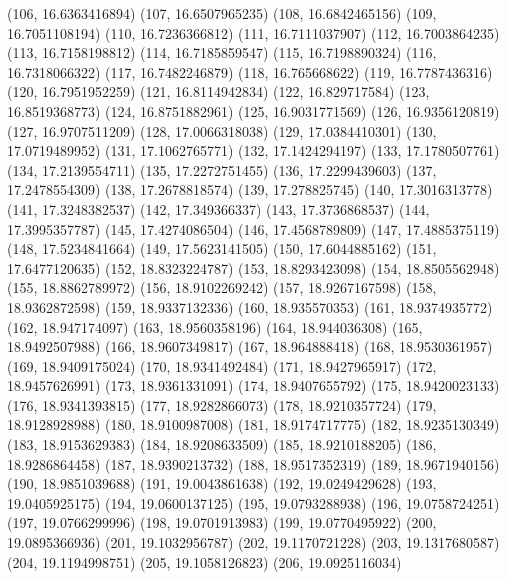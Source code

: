 {					(106, 16.6363416894)
					(107, 16.6507965235)
					(108, 16.6842465156)
					(109, 16.7051108194)
					(110, 16.7236366812)
					(111, 16.7111037907)
					(112, 16.7003864235)
					(113, 16.7158198812)
					(114, 16.7185859547)
					(115, 16.7198890324)
					(116, 16.7318066322)
					(117, 16.7482246879)
					(118, 16.765668622)
					(119, 16.7787436316)
					(120, 16.7951952259)
					(121, 16.8114942834)
					(122, 16.829717584)
					(123, 16.8519368773)
					(124, 16.8751882961)
					(125, 16.9031771569)
					(126, 16.9356120819)
					(127, 16.9707511209)
					(128, 17.0066318038)
					(129, 17.0384410301)
					(130, 17.0719489952)
					(131, 17.1062765771)
					(132, 17.1424294197)
					(133, 17.1780507761)
					(134, 17.2139554711)
					(135, 17.2272751455)
					(136, 17.2299439603)
					(137, 17.2478554309)
					(138, 17.2678818574)
					(139, 17.278825745)
					(140, 17.3016313778)
					(141, 17.3248382537)
					(142, 17.349366337)
					(143, 17.3736868537)
					(144, 17.3995357787)
					(145, 17.4274086504)
					(146, 17.4568789809)
					(147, 17.4885375119)
					(148, 17.5234841664)
					(149, 17.5623141505)
					(150, 17.6044885162)
					(151, 17.6477120635)
					(152, 18.8323224787)
					(153, 18.8293423098)
					(154, 18.8505562948)
					(155, 18.8862789972)
					(156, 18.9102269242)
					(157, 18.9267167598)
					(158, 18.9362872598)
					(159, 18.9337132336)
					(160, 18.935570353)
					(161, 18.9374935772)
					(162, 18.947174097)
					(163, 18.9560358196)
					(164, 18.944036308)
					(165, 18.9492507988)
					(166, 18.9607349817)
					(167, 18.964888418)
					(168, 18.9530361957)
					(169, 18.9409175024)
					(170, 18.9341492484)
					(171, 18.9427965917)
					(172, 18.9457626991)
					(173, 18.9361331091)
					(174, 18.9407655792)
					(175, 18.9420023133)
					(176, 18.9341393815)
					(177, 18.9282866073)
					(178, 18.9210357724)
					(179, 18.9128928988)
					(180, 18.9100987008)
					(181, 18.9174717775)
					(182, 18.9235130349)
					(183, 18.9153629383)
					(184, 18.9208633509)
					(185, 18.9210188205)
					(186, 18.9286864458)
					(187, 18.9390213732)
					(188, 18.9517352319)
					(189, 18.9671940156)
					(190, 18.9851039688)
					(191, 19.0043861638)
					(192, 19.0249429628)
					(193, 19.0405925175)
					(194, 19.0600137125)
					(195, 19.0793288938)
					(196, 19.0758724251)
					(197, 19.0766299996)
					(198, 19.0701913983)
					(199, 19.0770495922)
					(200, 19.0895366936)
					(201, 19.1032956787)
					(202, 19.1170721228)
					(203, 19.1317680587)
					(204, 19.1194998751)
					(205, 19.1058126823)
					(206, 19.0925116034)
}
